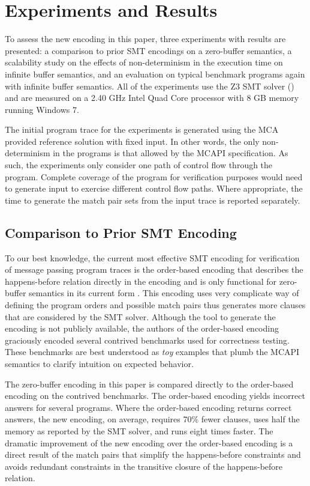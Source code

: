 \section{Experiments and Results}
To assess the new encoding in this paper, three experiments with
results are presented: a comparison to prior SMT encodings on a
zero-buffer semantics, a scalability study on the effects of
non-determinism in the execution time on infinite buffer semantics,
and an evaluation on typical benchmark programs again with infinite
buffer semantics. All of the experiments use the Z3 SMT solver
(\cite{demoura:tacas08}) and are measured on a 2.40 GHz Intel Quad
Core processor with 8 GB memory running Windows 7.

The initial program trace for the experiments is generated using the
MCA provided reference solution with fixed input. In other words, the
only non-determinism in the programs is that allowed by the MCAPI
specification. As such, the experiments only consider
one path of control flow through the program. Complete coverage of the
program for verification purposes would need to generate input to
exercise different control flow paths.  Where appropriate, the time to
generate the match pair sets from the input trace is reported
separately.

\subsection{Comparison to Prior SMT Encoding}
To our best knowledge, the current most effective SMT encoding for
verification of message passing program traces is the order-based
encoding that describes the happens-before relation directly in the
encoding and is only functional for zero-buffer semantics in its
current form \cite{elwakil:padtad10}. This encoding uses very complicate way of defining the program orders and possible match pairs thus generates more clauses that are considered by the SMT solver.  Although the tool to generate
the encoding is not publicly available, the authors of the order-based
encoding graciously encoded several contrived benchmarks used for
correctness testing. These benchmarks are best understood as
\emph{toy} examples that plumb the MCAPI semantics to clarify
intuition on expected behavior.

The zero-buffer encoding in this paper is compared directly to the
order-based encoding on the contrived benchmarks. The order-based
encoding yields incorrect answers for several programs. Where the
order-based encoding returns correct answers, the new encoding, on
average, requires 70\% fewer clauses, uses half the memory as reported
by the SMT solver, and runs eight times faster. The dramatic
improvement of the new encoding over the order-based encoding is a
direct result of the match pairs that simplify the happens-before
constraints and avoids redundant constraints in the transitive closure
of the happens-before relation.

